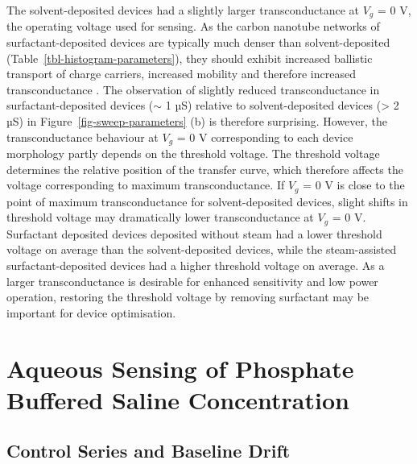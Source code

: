 \documentclass[
  a4paper,
]{scrbook}
\begin{document}
The solvent-deposited devices had a slightly larger transconductance at
\(V_g\) = 0 V, the operating voltage used for sensing. As the carbon
nanotube networks of surfactant-deposited devices are typically much
denser than solvent-deposited (Table~\ref{tbl-histogram-parameters}),
they should exhibit increased ballistic transport of charge carriers,
increased mobility and therefore increased transconductance
\autocite{Rouhi2011}. The observation of slightly reduced
transconductance in surfactant-deposited devices (\(\sim\) 1 µS)
relative to solvent-deposited devices (\textgreater{} 2 µS) in
Figure~\ref{fig-sweep-parameters} (b) is therefore surprising. However,
the transconductance behaviour at \(V_g\) = 0 V corresponding to each
device morphology partly depends on the threshold voltage. The threshold
voltage determines the relative position of the transfer curve, which
therefore affects the voltage corresponding to maximum transconductance.
If \(V_g\) = 0 V is close to the point of maximum transconductance for
solvent-deposited devices, slight shifts in threshold voltage may
dramatically lower transconductance at \(V_g\) = 0 V. Surfactant
deposited devices deposited without steam had a lower threshold voltage
on average than the solvent-deposited devices, while the steam-assisted
surfactant-deposited devices had a higher threshold voltage on average.
As a larger transconductance is desirable for enhanced sensitivity and
low power operation, restoring the threshold voltage by removing
surfactant may be important for device optimisation.

\hypertarget{sec-dummy-sensing}{%
\section{Aqueous Sensing of Phosphate Buffered Saline
Concentration}\label{sec-dummy-sensing}}

\hypertarget{sec-baseline-drift}{%
\subsection{Control Series and Baseline
Drift}\label{sec-baseline-drift}}
\end{document}
